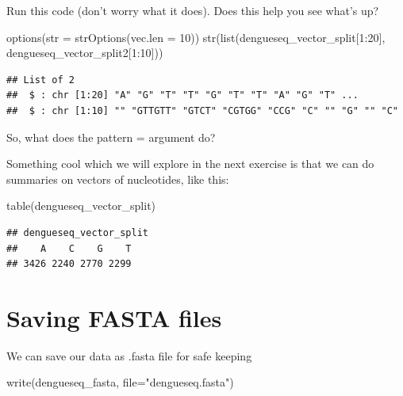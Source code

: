 \documentclass[
]{book}
\newenvironment{Shaded}{\begin{snugshade}}{\end{snugshade}}
\newcommand{\AttributeTok}[1]{\textcolor[rgb]{0.77,0.63,0.00}{#1}}
\newcommand{\DecValTok}[1]{\textcolor[rgb]{0.00,0.00,0.81}{#1}}
\newcommand{\FunctionTok}[1]{\textcolor[rgb]{0.00,0.00,0.00}{#1}}
\newcommand{\NormalTok}[1]{#1}
\newcommand{\SpecialCharTok}[1]{\textcolor[rgb]{0.00,0.00,0.00}{#1}}
\newcommand{\StringTok}[1]{\textcolor[rgb]{0.31,0.60,0.02}{#1}}
\begin{document}
Run this code (don't worry what it does). Does this help you see what's up?

\begin{Shaded}
\begin{Highlighting}[]
\FunctionTok{options}\NormalTok{(}\AttributeTok{str =} \FunctionTok{strOptions}\NormalTok{(}\AttributeTok{vec.len =} \DecValTok{10}\NormalTok{))}
\FunctionTok{str}\NormalTok{(}\FunctionTok{list}\NormalTok{(dengueseq\_vector\_split[}\DecValTok{1}\SpecialCharTok{:}\DecValTok{20}\NormalTok{],}
\NormalTok{     dengueseq\_vector\_split2[}\DecValTok{1}\SpecialCharTok{:}\DecValTok{10}\NormalTok{]))}
\end{Highlighting}
\end{Shaded}

\begin{verbatim}
## List of 2
##  $ : chr [1:20] "A" "G" "T" "T" "G" "T" "T" "A" "G" "T" ...
##  $ : chr [1:10] "" "GTTGTT" "GTCT" "CGTGG" "CCG" "C" "" "G" "" "C"
\end{verbatim}

So, what does the pattern = argument do?

Something cool which we will explore in the next exercise is that we can do summaries on vectors of nucleotides, like this:

\begin{Shaded}
\begin{Highlighting}[]
\FunctionTok{table}\NormalTok{(dengueseq\_vector\_split)}
\end{Highlighting}
\end{Shaded}

\begin{verbatim}
## dengueseq_vector_split
##    A    C    G    T 
## 3426 2240 2770 2299
\end{verbatim}

\hypertarget{saving-fasta-files}{%
\section{Saving FASTA files}\label{saving-fasta-files}}

We can save our data as .fasta file for safe keeping

\begin{Shaded}
\begin{Highlighting}[]
\FunctionTok{write}\NormalTok{(dengueseq\_fasta, }\AttributeTok{file=}\StringTok{"dengueseq.fasta"}\NormalTok{)}
\end{Highlighting}
\end{Shaded}
\end{document}
